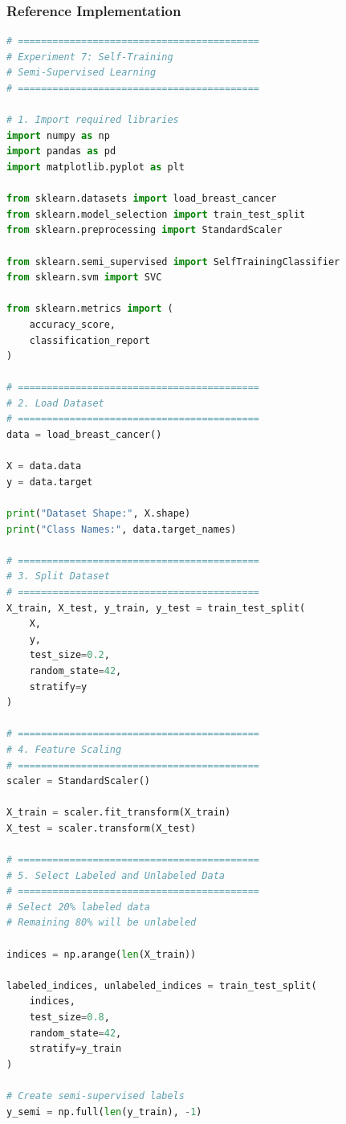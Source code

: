 \documentclass[a4paper,11pt]{article}
\begin{document}
\subsubsection{Reference Implementation}
\begin{lstlisting}[language=Python, caption={Self-Training Implementation}]
# ==========================================
# Experiment 7: Self-Training
# Semi-Supervised Learning
# ==========================================

# 1. Import required libraries
import numpy as np
import pandas as pd
import matplotlib.pyplot as plt

from sklearn.datasets import load_breast_cancer
from sklearn.model_selection import train_test_split
from sklearn.preprocessing import StandardScaler

from sklearn.semi_supervised import SelfTrainingClassifier
from sklearn.svm import SVC

from sklearn.metrics import (
    accuracy_score,
    classification_report
)

# ==========================================
# 2. Load Dataset
# ==========================================
data = load_breast_cancer()

X = data.data
y = data.target

print("Dataset Shape:", X.shape)
print("Class Names:", data.target_names)

# ==========================================
# 3. Split Dataset
# ==========================================
X_train, X_test, y_train, y_test = train_test_split(
    X,
    y,
    test_size=0.2,
    random_state=42,
    stratify=y
)

# ==========================================
# 4. Feature Scaling
# ==========================================
scaler = StandardScaler()

X_train = scaler.fit_transform(X_train)
X_test = scaler.transform(X_test)

# ==========================================
# 5. Select Labeled and Unlabeled Data
# ==========================================
# Select 20% labeled data
# Remaining 80% will be unlabeled

indices = np.arange(len(X_train))

labeled_indices, unlabeled_indices = train_test_split(
    indices,
    test_size=0.8,
    random_state=42,
    stratify=y_train
)

# Create semi-supervised labels
y_semi = np.full(len(y_train), -1)


\end{lstlisting}
\end{document}
